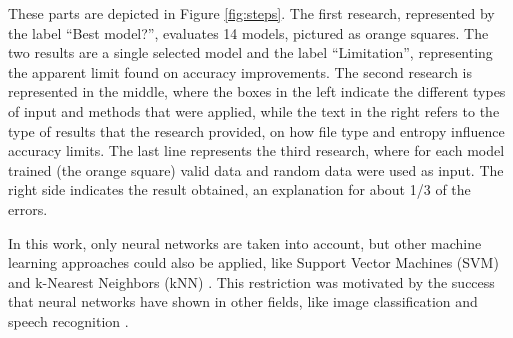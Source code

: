 These parts are depicted in Figure \ref{fig:steps}. The first research, represented by the label ``Best model?'', evaluates 14 models, pictured as orange squares. The two results are a single selected model and the label ``Limitation'', representing the apparent limit found on accuracy improvements. The second research is represented in the middle, where the boxes in the left indicate the different types of input and methods that were applied, while the text in the right refers to the type of results that the research provided, on how file type and entropy influence accuracy limits. The last line represents the third research, where for each model trained (the orange square) valid data and random data were used as input. The right side indicates the result obtained, an explanation for about 1/3 of the errors.

In this work, only neural networks are taken into account, but other machine learning approaches could also be applied, like Support Vector Machines (SVM) \cite{fitzgerald_using_2012} and k-Nearest Neighbors (kNN) \cite{axelsson_normalised_2010}. This restriction was motivated by the success that neural networks have shown in other fields, like image classification \cite{matan_reading_1992} and speech recognition \cite{graves_speech_2013}.
